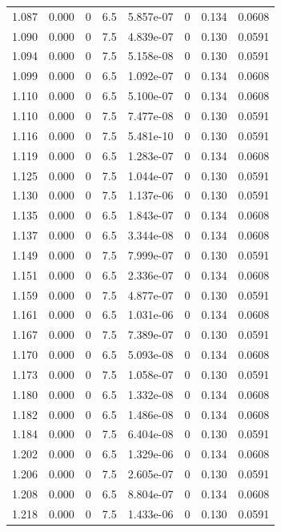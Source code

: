 \documentclass[preview]{standalone}
\begin{document}
{{{{\begin{tabular}{L{1.2cm}C{1.2cm} C{0.3cm}C{0.5cm} C{1.4cm}C{1.4cm} C{1.4cm}C{1.4cm}}
  1.087  &  0.000  & 0     & 6.5 &  5.857e-07  & 0  & 0.134 &  0.0608   \\ 
  1.090  &  0.000  & 0     & 7.5 &  4.839e-07  & 0  & 0.130 &  0.0591   \\ 
  1.094  &  0.000  & 0     & 7.5 &  5.158e-08  & 0  & 0.130 &  0.0591   \\ 
  1.099  &  0.000  & 0     & 6.5 &  1.092e-07  & 0  & 0.134 &  0.0608   \\ 
  1.110  &  0.000  & 0     & 6.5 &  5.100e-07  & 0  & 0.134 &  0.0608   \\ 
  1.110  &  0.000  & 0     & 7.5 &  7.477e-08  & 0  & 0.130 &  0.0591   \\ 
  1.116  &  0.000  & 0     & 7.5 &  5.481e-10  & 0  & 0.130 &  0.0591   \\ 
  1.119  &  0.000  & 0     & 6.5 &  1.283e-07  & 0  & 0.134 &  0.0608   \\ 
  1.125  &  0.000  & 0     & 7.5 &  1.044e-07  & 0  & 0.130 &  0.0591   \\ 
  1.130  &  0.000  & 0     & 7.5 &  1.137e-06  & 0  & 0.130 &  0.0591   \\ 
  1.135  &  0.000  & 0     & 6.5 &  1.843e-07  & 0  & 0.134 &  0.0608   \\ 
  1.137  &  0.000  & 0     & 6.5 &  3.344e-08  & 0  & 0.134 &  0.0608   \\ 
  1.149  &  0.000  & 0     & 7.5 &  7.999e-07  & 0  & 0.130 &  0.0591   \\ 
  1.151  &  0.000  & 0     & 6.5 &  2.336e-07  & 0  & 0.134 &  0.0608   \\ 
  1.159  &  0.000  & 0     & 7.5 &  4.877e-07  & 0  & 0.130 &  0.0591   \\ 
  1.161  &  0.000  & 0     & 6.5 &  1.031e-06  & 0  & 0.134 &  0.0608   \\ 
  1.167  &  0.000  & 0     & 7.5 &  7.389e-07  & 0  & 0.130 &  0.0591   \\ 
  1.170  &  0.000  & 0     & 6.5 &  5.093e-08  & 0  & 0.134 &  0.0608   \\ 
  1.173  &  0.000  & 0     & 7.5 &  1.058e-07  & 0  & 0.130 &  0.0591   \\ 
  1.180  &  0.000  & 0     & 6.5 &  1.332e-08  & 0  & 0.134 &  0.0608   \\ 
  1.182  &  0.000  & 0     & 6.5 &  1.486e-08  & 0  & 0.134 &  0.0608   \\ 
  1.184  &  0.000  & 0     & 7.5 &  6.404e-08  & 0  & 0.130 &  0.0591   \\ 
  1.202  &  0.000  & 0     & 6.5 &  1.329e-06  & 0  & 0.134 &  0.0608   \\ 
  1.206  &  0.000  & 0     & 7.5 &  2.605e-07  & 0  & 0.130 &  0.0591   \\ 
  1.208  &  0.000  & 0     & 6.5 &  8.804e-07  & 0  & 0.134 &  0.0608   \\ 
  1.218  &  0.000  & 0     & 7.5 &  1.433e-06  & 0  & 0.130 &  0.0591   \\ 
\hline 
\end{tabular} 

}}}}
\end{document}

